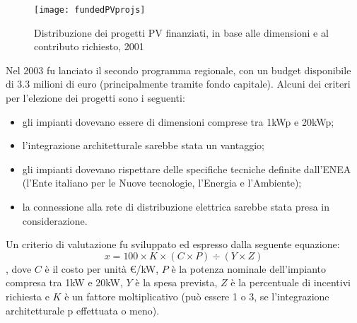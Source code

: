 \documentclass[12pt,a4paper,openright,twoside]{report}
\begin{document}
\begin{figure}[hbt]
	\centering
	\texttt{[image: fundedPVprojs]}
	\caption{Distribuzione dei progetti PV finanziati, in base alle dimensioni e al contributo richiesto, 2001}
	\label{fundedPVprojs}
\end{figure}


Nel 2003 fu lanciato il secondo programma regionale, con un budget disponibile di 3.3 milioni di euro (principalmente tramite fondo capitale). Alcuni dei criteri per l'elezione dei progetti sono i seguenti: 
\begin{itemize}
\item gli impianti dovevano essere di dimensioni comprese tra 1kWp e 20kWp;
\item l'integrazione architetturale sarebbe stata un vantaggio;
\item gli impianti dovevano rispettare delle specifiche tecniche definite dall'ENEA (l'Ente italiano per le Nuove tecnologie, l'Energia e l'Ambiente);
\item la connessione alla rete di distribuzione elettrica sarebbe stata presa in considerazione.
\end{itemize}
Un criterio di valutazione fu sviluppato ed espresso dalla seguente equazione:
\begin{equation} \label{eq:evaluatioCriteria2003program}
	x = 100 \times K \times (C \times P) \div (Y \times Z)
\end{equation}
, dove $C$ è il costo per unità \euro/kW, $P$ è la potenza nominale dell'impianto compresa tra 1kW e 20kW, $Y$ è la spesa prevista, $Z$ è la percentuale di incentivi richiesta e $K$ è un fattore moltiplicativo (può essere 1 o 3, se l'integrazione architetturale p effettuata o meno). 

\nocite{*}


\end{document}
